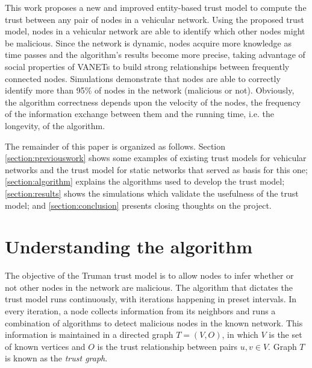 \documentclass[conference]{IEEEtran}
\begin{document}
This work proposes a new and improved entity-based trust model to compute the trust between any pair of nodes in a vehicular network.
Using the proposed trust model, nodes in a vehicular network are able to identify which other nodes might be malicious.
Since the network is dynamic, nodes acquire more knowledge as time passes and the algorithm's results become more precise, taking advantage of social properties of VANETs \cite{da2013effective} \cite{cunha2014possible} to build strong relationships between frequently connected nodes.
Simulations demonstrate that nodes are able to correctly identify more than 95\% of nodes in the network (malicious or not). Obviously, the algorithm correctness depends upon the velocity of the nodes, the frequency of the information exchange between them and the running time, i.e. the longevity, of the algorithm.


The remainder of this paper is organized as follows.
Section \ref{section:previouswork} shows some examples of existing trust models for vehicular networks and the trust model for static networks that served as basis for this one;
\autoref{section:algorithm} explains the algorithms used to develop the trust model;
\autoref{section:results} shows the simulations which validate the usefulness of the trust model;
and \autoref{section:conclusion} presents closing thoughts on the project.

\section{Understanding the algorithm}
\label{section:algorithm}


The objective of the Truman trust model is to allow nodes to infer whether or not other nodes in the network are malicious.
The algorithm that dictates the trust model runs continuously, with iterations happening in preset intervals.
In every iteration, a node collects information from its neighbors and runs a combination of algorithms to detect malicious nodes in the known network.
This information is maintained in a directed graph $T=(V,O)$, in which $V$ is the set of known vertices and $O$ is the trust relationship between pairs $u,v \in V$.
Graph $T$ is known as the \textit{trust graph}.
\end{document}
